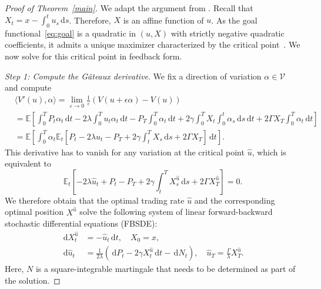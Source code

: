 \documentclass[11pt]{article}
\theoremstyle{definition}
\theoremstyle{remark}
\newtheorem{rem}[thm]{Remark}
\newcommand{\E}{\mathbb{E}} %
\DeclarePairedDelimiter{\abs}{\lvert}{\rvert} %
\newcommand{\ts}{\textstyle}
\newcommand{\closeEqn}{\tag*{$\diamond$}}
\newcommand{\de}{\,\mathrm{d}}
\begin{document}

\begin{proof}[Proof of Theorem~\ref{main}]
We adapt the argument from \cite{bank.al.17,bouchard2017equilibrium}. Recall that $X_t = x-\int_0^t u_s \de s$. Therefore, $X$ is an affine function of $u$. As the goal functional~\eqref{eq:goal} is a quadratic in $(u,X)$ with strictly negative quadratic coefficients, it admits a unique maximizer characterized by the critical point~\cite{ekeland1999convex}. We now solve for this critical point in feedback form.

\emph{Step 1: Compute the G\^ateaux derivative}. We fix a direction of variation $\alpha \in \mathcal{V}$ and compute
\begin{align*}
&\langle V'(u), \alpha \rangle = \lim_{\varepsilon \to 0}\tfrac{1}{\varepsilon}(V(u+\epsilon\alpha)-V(u))  \\
&= \E\left[\int_0^T P_t \alpha_t \de t - 2\lambda\int_0^T u_t \alpha_t \de t - P_T \int_0^T \alpha_t \de t + 2\gamma\int_0^T X_t \int_0^t \alpha_s \de s \de t + 2\Gamma X_T \int_0^T \alpha_t \de t \right] \\
&= \E\left[\int_0^T \alpha_t \E_t\left[P_t - 2\lambda u_t - P_T + 2\gamma\int_t^T X_s \de s + 2\Gamma X_T \right] \de t\right].
\end{align*}
This derivative has to vanish for any variation at the critical point $\hat{u}$, which is equivalent to
\begin{equation}\label{eq:foc}
\E_t\left[-2\lambda \hat{u}_t + P_t - P_T + 2\gamma\int_t^T X^{\hat{u}}_s \de s + 2\Gamma X^{\hat{u}}_T \right] = 0.
\end{equation}
We therefore obtain that the optimal trading rate $\hat{u}$ and the corresponding optimal position $X^{\hat{u}}$ solve the following system of linear forward-backward stochastic differential equations (FBSDE):
\begin{equation}\label{eq:FBSDE}
\begin{split}
\de X^{\hat{u}}_t &= - \hat{u}_t \de t, \quad X_0=x, \\
\de\hat{u}_t &= \frac{1}{2\lambda}\left(\de P_t-2\gamma X^{\hat{u}}_t \de t - \de N_t\right), \quad \hat{u}_T=\frac{\Gamma}{\lambda} X^{\hat{u}}_T.
\end{split}
\end{equation}
Here, $N$ is a square-integrable martingale that needs to be determined as part of the solution. 


\end{proof}
\end{document}

